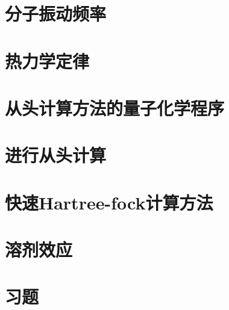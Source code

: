 \section{分子振动频率}

\section{热力学定律}

\section{从头计算方法的量子化学程序}

\section{进行从头计算}

\section{快速Hartree-fock计算方法}

\section{溶剂效应}

\section*{习题}